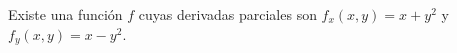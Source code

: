 \item Existe una función $f$ cuyas derivadas parciales son $f_x(x, y) = x + y^2$ y $f_y(x, y) = x - y^2$.

